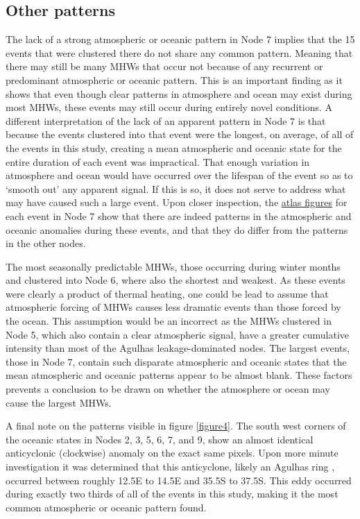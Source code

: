 \documentclass[utf8]{frontiersSCNS}
\begin{document}
\subsection{Other patterns}
The lack of a strong atmospheric or oceanic pattern in Node 7 implies that the 15 events that were clustered there do not share any common pattern. Meaning that there may still be many MHWs that occur not because of any recurrent or predominant atmospheric or oceanic pattern. This is an important finding as it shows that even though clear patterns in atmosphere and ocean may exist during most MHWs, these events may still occur during entirely novel conditions. A different interpretation of the lack of an apparent pattern in Node 7 is that because the events clustered into that event were the longest, on average, of all of the events in this study, creating a mean atmospheric and oceanic state for the entire duration of each event was impractical. That enough variation in atmosphere and ocean would have occurred over the lifespan of the event so as to `smooth out' any apparent signal. If this is so, it does not serve to address what may have caused such a large event. Upon closer inspection, the \href{https://github.com/schrob040/AHW/tree/master/graph/synoptic}{atlas figures} for each event in Node 7 show that there are indeed patterns in the atmospheric and oceanic anomalies during these events, and that they do differ from the patterns in the other nodes.

The most seasonally predictable MHWs, those occurring during winter months and clustered into Node 6, where also the shortest and weakest. As these events were clearly a product of thermal heating, one could be lead to assume that atmospheric forcing of MHWs causes less dramatic events than those forced by the ocean. This assumption would be an incorrect as the MHWs clustered in Node 5, which also contain a clear atmospheric signal, have a greater cumulative intensity than most of the Agulhas leakage-dominated nodes. The largest events, those in Node 7, contain such disparate atmospheric and oceanic states that the mean atmospheric and oceanic patterns appear to be almost blank. These factors prevents a conclusion to be drawn on whether the atmosphere or ocean may cause the largest MHWs.

A final note on the patterns visible in figure \ref{figure4}. The south west corners of the oceanic states in Nodes 2, 3, 5, 6, 7, and 9, show an almost identical anticyclonic (clockwise) anomaly on the exact same pixels. Upon more minute investigation it was determined that this anticyclone, likely an Agulhas ring \citep{Hutchings2009}, occurred between roughly 12.5\degree E to 14.5\degree E and 35.5\degree S to 37.5\degree S. This eddy occurred during exactly two thirds of all of the events in this study, making it the most common atmospheric or oceanic pattern found.
\end{document}
